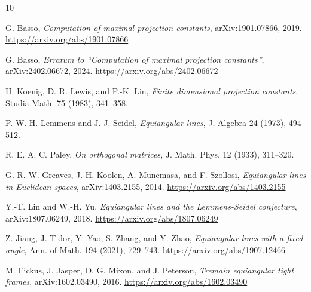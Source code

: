 \documentclass[11pt]{article}
\begin{document}
\begin{thebibliography}{10}

G. Basso,
\emph{Computation of maximal projection constants},
arXiv:1901.07866, 2019.
\url{https://arxiv.org/abs/1901.07866}

G. Basso,
\emph{Erratum to ``Computation of maximal projection constants''},
arXiv:2402.06672, 2024.
\url{https://arxiv.org/abs/2402.06672}

H. Koenig, D. R. Lewis, and P.-K. Lin,
\emph{Finite dimensional projection constants},
Studia Math. 75 (1983), 341--358.

P. W. H. Lemmens and J. J. Seidel,
\emph{Equiangular lines},
J. Algebra 24 (1973), 494--512.

R. E. A. C. Paley,
\emph{On orthogonal matrices},
J. Math. Phys. 12 (1933), 311--320.

G. R. W. Greaves, J. H. Koolen, A. Munemasa, and F. Szollosi,
\emph{Equiangular lines in Euclidean spaces},
arXiv:1403.2155, 2014.
\url{https://arxiv.org/abs/1403.2155}

Y.-T. Lin and W.-H. Yu,
\emph{Equiangular lines and the Lemmens-Seidel conjecture},
arXiv:1807.06249, 2018.
\url{https://arxiv.org/abs/1807.06249}

Z. Jiang, J. Tidor, Y. Yao, S. Zhang, and Y. Zhao,
\emph{Equiangular lines with a fixed angle},
Ann. of Math. 194 (2021), 729--743.
\url{https://arxiv.org/abs/1907.12466}

M. Fickus, J. Jasper, D. G. Mixon, and J. Peterson,
\emph{Tremain equiangular tight frames},
arXiv:1602.03490, 2016.
\url{https://arxiv.org/abs/1602.03490}

\end{thebibliography}
\end{document}
